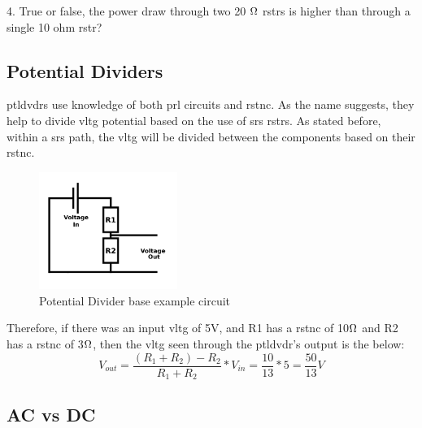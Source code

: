 \documentclass[a4paper,11pt]{report}
\begin{document}
4. True or false, the power draw through two  20 $\ohm$ \gls{rstr}s is higher than through a single 10 ohm \gls{rstr}?

\vspace*{1\baselineskip}

\subsection{Potential Dividers}

\gls{ptldvdr}s use knowledge of both \gls{prl} circuits and \gls{rstnc}. As the name suggests, they help to divide \gls{vltg} potential based on the use of \gls{srs} \gls{rstr}s. As stated before, within a \gls{srs} path, the \gls{vltg} will be divided between the components based on their \gls{rstnc}.

\begin{figure}[H]
\centering
\includegraphics[width=0.4\textwidth]{PotentialDivider}
\caption{Potential Divider base example circuit}
\end{figure}

Therefore, if there was an input \gls{vltg} of 5V, and R1 has a \gls{rstnc} of 10$\ohm$ and R2 has a \gls{rstnc} of 3$\ohm$, then the \gls{vltg} seen through the \gls{ptldvdr}'s output is the below:
\[V_{out}=\frac{(R_1+R_2)-R_2}{R_1+R_2}*V_{in} = \frac{10}{13}*5 = \frac{50}{13}V\]

\vspace*{1\baselineskip}

\subsection{AC vs DC}
\end{document}
